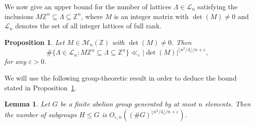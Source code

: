 \documentclass[11pt,reqno]{amsart}
\newtheorem{lem}[thm]{Lemma}
\newtheorem{prop}[thm]{Proposition}
\theoremstyle{definition}
\theoremstyle{remark}
\numberwithin{equation}{section}
\numberwithin{thm}{section}
\numberwithin{table}{section}
\def \Z {{\mathbb Z}}
\newcommand{\eps}{\varepsilon}
\begin{document}
We now give an upper bound for the number of lattices $\mathsf{\Lambda}\in \mathcal{L}_n$ satisfying the inclusions $M\Z^n\subseteq \mathsf{\Lambda} \subseteq \Z^n$, where $M$ is an integer matrix with $\det(M) \neq 0$ and  $\mathcal{L}_n$ denotes the set of all integer lattices of full rank.

\begin{prop}\label{prop:latticeinclusion}
    Let $M \in \mathcal{M}_n(\Z)$ with $\det(M) \neq 0$. Then 
    \[
    \# \{ \mathsf{\Lambda} \in \mathcal{L}_n: M \Z^n \subseteq \mathsf{\Lambda} \subseteq \Z^n \} \ll_{\varepsilon} |\det(M)|^{ \lfloor n^2 /4 \rfloor/n + \varepsilon } ,
    \]
    for any $\eps>0$.
\end{prop}


 We will use the following group-theoretic result in order to deduce the bound stated in Proposition~\ref{prop:latticeinclusion}.
 
\begin{lem}\label{lem:countingsubgroups}
    Let $G$ be a finite abelian group generated by at most $n$ elements. Then the number of subgroups $H \le G$ is  $O_{\varepsilon,n} ((\# G)^{\lfloor n^2 /4 \rfloor/n + \varepsilon})$.
\end{lem}
\end{document}
